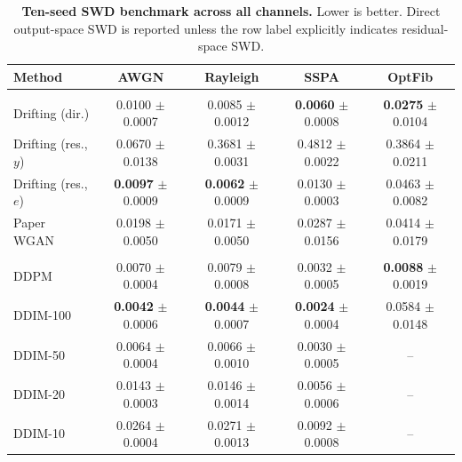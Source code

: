 \begin{table}[t]
\centering
\caption{\textbf{Ten-seed SWD benchmark across all channels.} Lower is better. Direct output-space SWD is reported unless the row label explicitly indicates residual-space SWD.}
\label{tab:benchmark-all-channels}
\tablefontsize
\begin{tabular}{@{}lcccc@{}}
\toprule
Method & AWGN & Rayleigh & SSPA & OptFib \\
\midrule
\rowcolor[gray]{0.9} \multicolumn{5}{l}{\textit{One-shot generators}} \\
\headspace Drifting (dir.) & 0.0100 $\pm$ 0.0007 & 0.0085 $\pm$ 0.0012 & \textbf{0.0060} $\pm$ 0.0008 & \textbf{0.0275} $\pm$ 0.0104 \\
\headspace Drifting (res., $y$) & 0.0670 $\pm$ 0.0138 & 0.3681 $\pm$ 0.0031 & 0.4812 $\pm$ 0.0022 & 0.3864 $\pm$ 0.0211 \\
\headspace Drifting (res., $e$) & \textbf{0.0097} $\pm$ 0.0009 & \textbf{0.0062} $\pm$ 0.0009 & 0.0130 $\pm$ 0.0003 & 0.0463 $\pm$ 0.0082 \\
\headspace Paper WGAN & 0.0198 $\pm$ 0.0050 & 0.0171 $\pm$ 0.0050 & 0.0287 $\pm$ 0.0156 & 0.0414 $\pm$ 0.0179 \\
\midrule
\rowcolor[gray]{0.9} \multicolumn{5}{l}{\textit{Diffusion samplers}} \\
\headspace DDPM & 0.0070 $\pm$ 0.0004 & 0.0079 $\pm$ 0.0008 & 0.0032 $\pm$ 0.0005 & \textbf{0.0088} $\pm$ 0.0019 \\
\headspace DDIM-100 & \textbf{0.0042} $\pm$ 0.0006 & \textbf{0.0044} $\pm$ 0.0007 & \textbf{0.0024} $\pm$ 0.0004 & 0.0584 $\pm$ 0.0148 \\
\headspace DDIM-50 & 0.0064 $\pm$ 0.0004 & 0.0066 $\pm$ 0.0010 & 0.0030 $\pm$ 0.0005 & -- \\
\headspace DDIM-20 & 0.0143 $\pm$ 0.0003 & 0.0146 $\pm$ 0.0014 & 0.0056 $\pm$ 0.0006 & -- \\
\headspace DDIM-10 & 0.0264 $\pm$ 0.0004 & 0.0271 $\pm$ 0.0013 & 0.0092 $\pm$ 0.0008 & -- \\
\bottomrule
\end{tabular}
\end{table}
